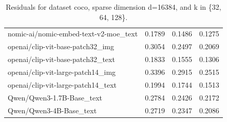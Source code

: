 \begin{table}[ht]
\begin{tabular}{lccc}
nomic-ai/nomic-embed-text-v2-moe\_text & 0.1789 & 0.1486 & 0.1275 \\
openai/clip-vit-base-patch32\_img & 0.3054 & 0.2497 & 0.2069 \\
openai/clip-vit-base-patch32\_text & 0.1833 & 0.1555 & 0.1306 \\
openai/clip-vit-large-patch14\_img & 0.3396 & 0.2915 & 0.2515 \\
openai/clip-vit-large-patch14\_text & 0.1994 & 0.1744 & 0.1513 \\
Qwen/Qwen3-1.7B-Base\_text & 0.2784 & 0.2426 & 0.2172 \\
Qwen/Qwen3-4B-Base\_text & 0.2719 & 0.2347 & 0.2086 \\
\hline
\end{tabular}
\caption{Residuals for dataset coco, sparse dimension d=16384, and k in \{32, 64, 128\}.}
\label{tab:residuals_coco_d_16384}
\end{table}
